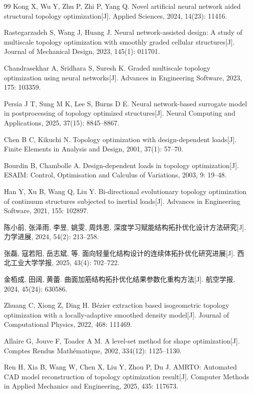 \documentclass{FRB-style}
\begin{document}
\begin{thebibliography}{99}
Kong X, Wu Y, Zhu P, Zhi P, Yang Q. Novel artificial neural network aided structural topology optimization[J]. Applied Sciences, 2024, 14(23): 11416.

Rastegarzadeh S, Wang J, Huang J. Neural network-assisted design: A study of multiscale topology optimization with smoothly graded cellular structures[J]. Journal of Mechanical Design, 2023, 145(1): 011701.

Chandrasekhar A, Sridhara S, Suresh K. Graded multiscale topology optimization using neural networks[J]. Advances in Engineering Software, 2023, 175: 103359.

Persia J T, Sung M K, Lee S, Burns D E. Neural network-based surrogate model in postprocessing of topology optimized structures[J]. Neural Computing and Applications, 2025, 37(15): 8845--8867.

Chen B C, Kikuchi N. Topology optimization with design-dependent loads[J]. Finite Elements in Analysis and Design, 2001, 37(1): 57--70.

Bourdin B, Chambolle A. Design-dependent loads in topology optimization[J]. ESAIM: Control, Optimisation and Calculus of Variations, 2003, 9: 19--48.

Han Y, Xu B, Wang Q, Liu Y. Bi-directional evolutionary topology optimization of continuum structures subjected to inertial loads[J]. Advances in Engineering Software, 2021, 155: 102897.

陈小前, 张泽雨, 李昱, 姚雯, 周炜恩. 深度学习赋能结构拓扑优化设计方法研究[J]. 力学进展, 2024, 54(2): 213--258.

张磊, 寇若阳, 岳志斌, 等. 面向轻量化结构设计的连续体拓扑优化研究进展[J]. 西北工业大学学报, 2025, 43(4): 702--722.

金栢成, 田阔, 黄蕾. 曲面加筋结构拓扑优化结果参数化重构方法[J]. 航空学报, 2024, 45(24): 630586.

Zhuang C, Xiong Z, Ding H. B{\'e}zier extraction based isogeometric topology optimization with a locally-adaptive smoothed density model[J]. Journal of Computational Physics, 2022, 468: 111469.

Allaire G, Jouve F, Toader A M. A level-set method for shape optimization[J]. Comptes Rendus Mathématique, 2002, 334(12): 1125--1130.

Ren H, Xia B, Wang W, Chen X, Liu Y, Zhou P, Du J. AMRTO: Automated CAD model reconstruction of topology optimization result[J]. Computer Methods in Applied Mechanics and Engineering, 2025, 435: 117673.

\end{thebibliography}
\end{document}
